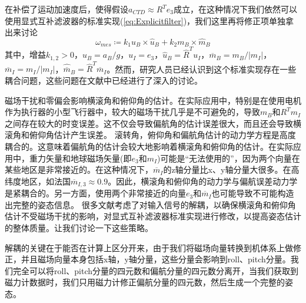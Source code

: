 \documentclass[
  type=master
]{gdutthesis}
\begin{document}
在补偿了运动加速度后，使得假设$a_{CTD} \approx R^T e_3$成立，在这种情况下我们依然可以使用显式互补滤波器的标准实现(\autoref{eq:Explicitfilter})，我们这里再将修正项单独拿出来讨论
\begin{equation}
\omega_{mes} \coloneqq k_1 u_B \times \hat{u}_B + k_2 m_B \times \hat{m}_B	
\end{equation}
其中，增益$k_{1,2}>0$，$u_B = a_B / g$，$u_I = e_3$，$\hat{u}_B = \hat{R}^T u_I$，$\overline{m}_B = m_B / \left| m_I \right|$，$\overline{m}_I = m_I / \left| m_I \right|$，$\hat{\overline{m}}_B = \hat{R}^T \overline{m}_I$。然而，研究人员已经认识到这个标准实现存在一些耦合问题，这些问题在文献\cite{hua2013implementation,hua2011nonlinear,martin2007invariant}中已经进行了深入的讨论。

磁场干扰和零偏会影响横滚角和俯仰角的估计。在实际应用中，特别是在使用电机作为执行器的小型飞行器中，较大的磁场干扰几乎是不可避免的，导致$m_B$和$R^T m_I$之间存在较大的时变误差。这不仅会导致偏航角的估计误差很大，而且还会导致横滚角和俯仰角估计产生误差。
滚转角，俯仰角和偏航角估计的动力学方程是高度耦合的。这意味着偏航角的估计会较大地影响着横滚角和俯仰角的估计。在实际应用中，重力矢量和地球磁场矢量(即$e_3$和$m_I$)可能是“无法使用的”，因为两个向量在某些地区是非常接近的。在这种情况下，$\overline{m}_I$的z轴分量比x、y轴分量大很多。在高纬度地区，如法国$\overline{m}_{I,3}\approx 0.9$。因此，横滚角和俯仰角的动力学与偏航误差动力学是紧耦合的。另一方面，使用两个非常接近的向量$e_3$和$\overline{m}_I$也可能导致不可能构造出完整的姿态信息。
很多文献考虑了对输入信号的解耦，以确保横滚角和俯仰角估计不受磁场干扰的影响，对显式互补滤波器标准实现进行修改，以提高姿态估计的整体质量。让我们讨论一下这些策略。

解耦的关键在于能否在计算上区分开来，由于我们将磁场向量转换到机体系上做修正，并且磁场向量本身包括x轴，y轴分量，这些分量会影响到roll、pitch分量。我们完全可以将roll、pitch分量的四元数和偏航分量的四元数分离开，当我们获取到磁力计数据时，我们只用磁力计修正偏航分量的四元数，然后生成一个完整的姿态。
\end{document}
